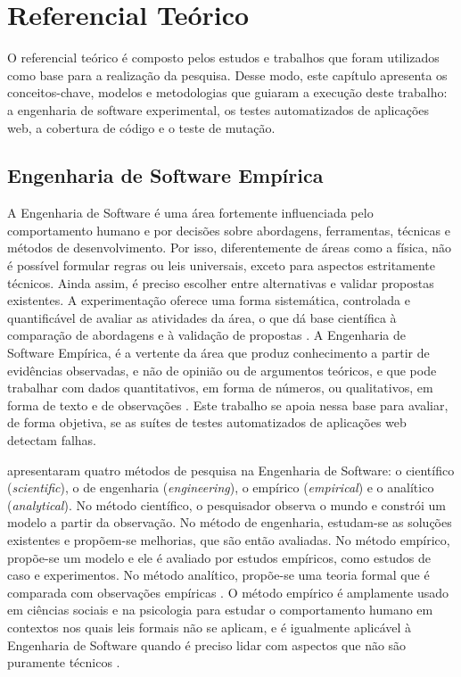 \chapter{Referencial Teórico}

O referencial teórico é composto pelos estudos e trabalhos que foram utilizados como base para a realização da pesquisa. Desse modo, este capítulo apresenta os conceitos-chave, modelos e metodologias que guiaram a execução deste trabalho: a engenharia de software experimental, os testes automatizados de aplicações web, a cobertura de código e o teste de mutação.

\section{Engenharia de Software Empírica}
\label{sec:eng-software-empirica}

A Engenharia de Software é uma área fortemente influenciada pelo comportamento humano e por decisões sobre abordagens, ferramentas, técnicas e métodos de desenvolvimento. Por isso, diferentemente de áreas como a física, não é possível formular regras ou leis universais, exceto para aspectos estritamente técnicos. Ainda assim, é preciso escolher entre alternativas e validar propostas existentes. A experimentação oferece uma forma sistemática, controlada e quantificável de avaliar as atividades da área, o que dá base científica à comparação de abordagens e à validação de propostas \cite{wohlin2015}. A Engenharia de Software Empírica, é a vertente da área que produz conhecimento a partir de evidências observadas, e não de opinião ou de argumentos teóricos, e que pode trabalhar com dados quantitativos, em forma de números, ou qualitativos, em forma de texto e de observações \cite{wohlin2015}. Este trabalho se apoia nessa base para avaliar, de forma objetiva, se as suítes de testes automatizados de aplicações web detectam falhas.

 apresentaram quatro métodos de pesquisa na Engenharia de Software: o científico (\textit{scientific}), o de engenharia (\textit{engineering}), o empírico (\textit{empirical}) e o analítico (\textit{analytical}). No método científico, o pesquisador observa o mundo e constrói um modelo a partir da observação. No método de engenharia, estudam-se as soluções existentes e propõem-se melhorias, que são então avaliadas. No método empírico, propõe-se um modelo e ele é avaliado por estudos empíricos, como estudos de caso e experimentos. No método analítico, propõe-se uma teoria formal que é comparada com observações empíricas \cite{wohlin2015}. O método empírico é amplamente usado em ciências sociais e na psicologia para estudar o comportamento humano em contextos nos quais leis formais não se aplicam, e é igualmente aplicável à Engenharia de Software quando é preciso lidar com aspectos que não são puramente técnicos \cite{wohlin2015}.

